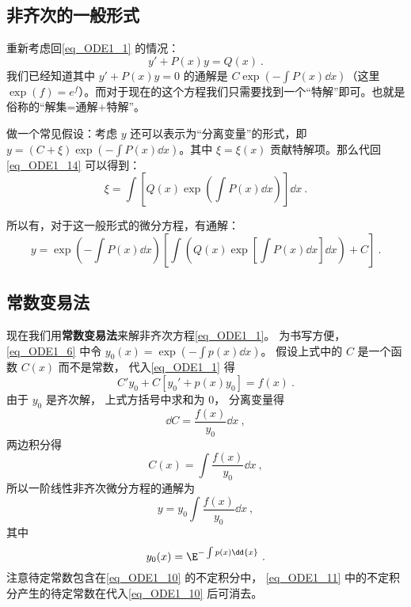 \subsection{非齐次的一般形式}
重新考虑回\autoref{eq_ODE1_1} 的情况：
\begin{equation}\label{eq_ODE1_14}
y'+ P(x) y = Q(x) ~.
\end{equation}
我们已经知道其中 $y' + P(x) y = 0$ 的通解是 $C \exp(- \int P(x) \dd x)$（这里 $\exp(f) = e^f$）。而对于现在的这个方程我们只需要找到一个“特解”即可。也就是俗称的“解集=通解+特解”。

做一个常见假设：考虑 $y$ 还可以表示为“分离变量”的形式，即 $y=(C+\xi) \exp(- \int P(x)\dd x)$。其中 $\xi=\xi(x)$ 贡献特解项。那么代回\autoref{eq_ODE1_14} 可以得到：
\begin{equation}
\xi = \int \left[Q(x) \exp(\int P(x) \dd x) \right]\dd x~.
\end{equation}

所以有，对于这一般形式的微分方程，有通解：
\begin{equation}
y = \exp(- \int P(x) \dd x)  \left[\int\left(Q(x) \exp\left[ \int P(x) \dd x\right] \dd x \right) + C\right]~.
\end{equation}



\subsection{常数变易法}

现在我们用\textbf{常数变易法}来解非齐次方程\autoref{eq_ODE1_1}。 为书写方便， \autoref{eq_ODE1_6} 中令 $y_0(x) = \exp(-\int p(x) \dd{x})$。 假设上式中的 $C$ 是一个函数 $C(x)$ 而不是常数， 代入\autoref{eq_ODE1_1} 得
\begin{equation}
C'y_0 + C[y_0' + p(x)y_0] = f(x)~.
\end{equation}
由于 $y_0$ 是齐次解， 上式方括号中求和为 0， 分离变量得
\begin{equation}
\dd{C}= \frac{f(x)}{y_0} \dd{x}~,
\end{equation}
两边积分得
\begin{equation}
C(x) = \int \frac{f(x)}{y_0} \dd{x}~,
\end{equation}
所以一阶线性非齐次微分方程的通解为
\begin{equation}\label{eq_ODE1_10}
y = y_0  \int \frac{f(x)}{y_0} \dd{x}~,
\end{equation}
其中
\begin{equation}\label{eq_ODE1_11}
y_0(x) = \E^{-\int p(x) \dd{x}}~.
\end{equation}
注意待定常数包含在\autoref{eq_ODE1_10} 的不定积分中， \autoref{eq_ODE1_11} 中的不定积分产生的待定常数在代入\autoref{eq_ODE1_10} 后可消去。

